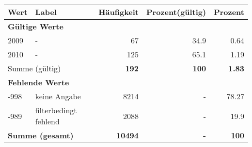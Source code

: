      \begin{longtable}{lXrrr}
     \toprule
     \textbf{Wert} & \textbf{Label} & \textbf{Häufigkeit} & \textbf{Prozent(gültig)} & \textbf{Prozent} \\
     \endhead
     \midrule
     \multicolumn{5}{l}{\textbf{Gültige Werte}}\\

     2009 &
     \multicolumn{1}{X}{ -  } &


       \num{67} &
       \num[round-mode=places,round-precision=2]{34.9} &
         \num[round-mode=places,round-precision=2]{0.64} \\

     2010 &
     \multicolumn{1}{X}{ -  } &


       \num{125} &
       \num[round-mode=places,round-precision=2]{65.1} &
         \num[round-mode=places,round-precision=2]{1.19} \\
     \midrule
     \multicolumn{2}{l}{Summe (gültig)} &
       \textbf{\num{192}} &
     \textbf{\num{100}} &
       \textbf{\num[round-mode=places,round-precision=2]{1.83}} \\
     \multicolumn{5}{l}{\textbf{Fehlende Werte}}\\
       -998 &
       keine Angabe &
         \num{8214} &
        - &
         \num[round-mode=places,round-precision=2]{78.27} \\
       -989 &
       filterbedingt fehlend &
         \num{2088} &
        - &
         \num[round-mode=places,round-precision=2]{19.9} \\
     \midrule
     \multicolumn{2}{l}{\textbf{Summe (gesamt)}} &
          \textbf{\num{10494}} &
        \textbf{-} &
        \textbf{\num{100}} \\
     \bottomrule
     \end{longtable}
     
